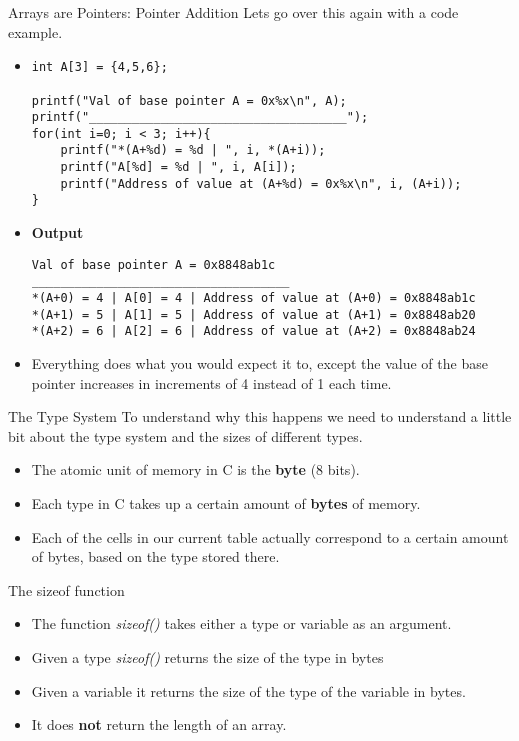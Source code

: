 \documentclass[10pt]{beamer}
\begin{document}
\begin{frame}[fragile]{Arrays are Pointers: Pointer Addition}
	Lets go over this again with a code example.
	\begin{itemize}[<+->]
	\item \begin{verbatim}
int A[3] = {4,5,6};

printf("Val of base pointer A = 0x%x\n", A);
printf("____________________________________");
for(int i=0; i < 3; i++){
	printf("*(A+%d) = %d | ", i, *(A+i));
	printf("A[%d] = %d | ", i, A[i]);
	printf("Address of value at (A+%d) = 0x%x\n", i, (A+i));
}
	\end{verbatim}
	\item {\bf Output}
\begin{verbatim}
Val of base pointer A = 0x8848ab1c
____________________________________
*(A+0) = 4 | A[0] = 4 | Address of value at (A+0) = 0x8848ab1c
*(A+1) = 5 | A[1] = 5 | Address of value at (A+1) = 0x8848ab20
*(A+2) = 6 | A[2] = 6 | Address of value at (A+2) = 0x8848ab24
\end{verbatim}
\item Everything does what you would expect it to, except the value of the base pointer increases in increments of 4 instead of 1 each time.
\end{itemize}
\end{frame}

\begin{frame}[fragile]{The Type System}
To understand why this happens we need to understand a little bit about the type system and the sizes of different types.
\begin{itemize}[<+->]
	\item The atomic unit of memory in C is the {\bf byte} (8 bits). 
	\item Each type in C takes up a certain amount of {\bf bytes} of memory.
	\item Each of the cells in our current table actually correspond to a certain amount of bytes, based on the type stored there.
\end{itemize}
\end{frame}
\begin{frame}[fragile]{The sizeof function }
\begin{itemize}[<+->]
	\item The function {\it sizeof()} takes either a type or variable as an argument.
	\item Given a type {\it sizeof()} returns the size of the type in bytes
	\item Given a variable it returns the size of the type of the variable in bytes. 
	\item It does {\bf not} return the length of an array.
\end{itemize}
\end{frame}
\end{document}
